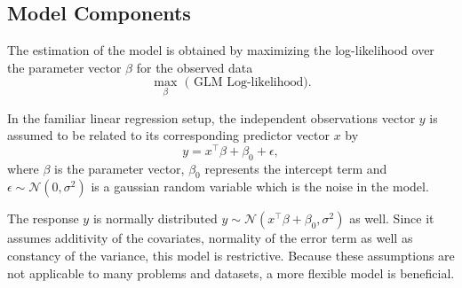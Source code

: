\subsection{Model Components}

The estimation of the model is obtained by maximizing the log-likelihood over the parameter vector $\beta$ for the observed data
 $$\max_{\beta} \mbox{ ( GLM Log-likelihood)}.$$


In the familiar linear regression setup, the independent observations vector $y$ is assumed to be related to its corresponding predictor vector $x$ by $$y = x^{\top}\beta + \beta_0 + \epsilon,$$ where $\beta$ is the parameter vector, $\beta_0$ represents the intercept term and $\epsilon \sim \mathcal{N}( 0, \sigma^2 )$ is a gaussian random variable which is the noise in the model. 

The response $y$ is normally distributed $y \sim \mathcal{N}( x^{\top} \beta + \beta_0, \sigma^2 )$ as well. Since it assumes additivity of the covariates, normality of the error term as well as constancy of the variance, this model is restrictive. Because these assumptions are not applicable to many problems and datasets, a more flexible model is beneficial. 


